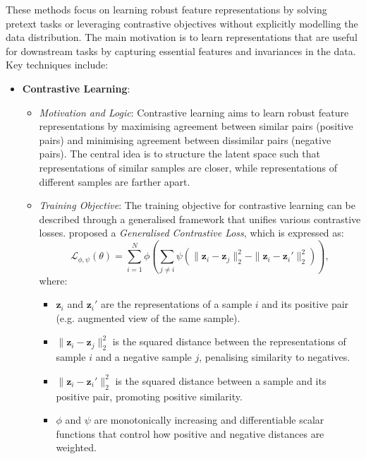 These methods focus on learning robust feature representations by solving pretext tasks or leveraging contrastive objectives without explicitly modelling the data distribution. The main motivation is to learn representations that are useful for downstream tasks by capturing essential features and invariances in the data. Key techniques include:

\begin{itemize}
    \item \textbf{Contrastive Learning}:
    \begin{itemize}
        \item \emph{Motivation and Logic}: Contrastive learning aims to learn robust feature representations by maximising agreement between similar pairs (positive pairs) and minimising agreement between dissimilar pairs (negative pairs). The central idea is to structure the latent space such that representations of similar samples are closer, while representations of different samples are farther apart.

        \item \emph{Training Objective}: The training objective for contrastive learning can be described through a generalised framework that unifies various contrastive losses. \citet{tian2022} proposed a \textit{Generalised Contrastive Loss}, which is expressed as:
        \[
        \mathcal{L}_{\phi,\psi}(\theta) = \sum_{i=1}^{N} \phi \left( \sum_{j \neq i} \psi\left(\|\mathbf{z}_i - \mathbf{z}_j\|_2^2 - \|\mathbf{z}_i - \mathbf{z}_i'\|_2^2\right) \right),
        \]
        where:
        \begin{itemize}
            \item \(\mathbf{z}_i\) and \(\mathbf{z}_i'\) are the representations of a sample \(i\) and its positive pair (e.g. augmented view of the same sample).
            \item \(\|\mathbf{z}_i - \mathbf{z}_j\|_2^2\) is the squared distance between the representations of sample \(i\) and a negative sample \(j\), penalising similarity to negatives.
            \item \(\|\mathbf{z}_i - \mathbf{z}_i'\|_2^2\) is the squared distance between a sample and its positive pair, promoting positive similarity.
            \item \(\phi\) and \(\psi\) are monotonically increasing and differentiable scalar functions that control how positive and negative distances are weighted.
        \end{itemize}


\end{itemize}
\end{itemize}
